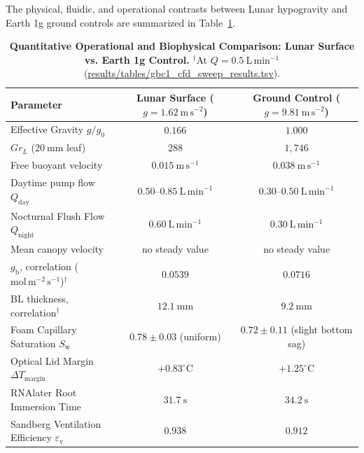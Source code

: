 \documentclass[pdflatex,sn-nature,iicol]{sn-jnl}
\begin{document}
The physical, fluidic, and operational contrasts between Lunar hypogravity and Earth 1g ground controls are summarized in Table~\ref{tab:comparison_matrix}.

\begin{table}[htbp]
\centering
\caption{\textbf{Quantitative Operational and Biophysical Comparison: Lunar Surface vs. Earth 1g Control.} $^{\dagger}$At $Q = 0.5\ \mathrm{L\,min^{-1}}$ (\url{results/tables/gbc1_cfd_sweep_results.tsv}).}
\label{tab:comparison_matrix}
\begin{tabular*}{\textwidth}{@{\extracolsep{\fill}}lcc@{\extracolsep{\fill}}}
\toprule
Parameter & Lunar Surface ($g = 1.62\ \mathrm{m\,s^{-2}}$) & Ground Control ($g = 9.81\ \mathrm{m\,s^{-2}}$) \\
\midrule
Effective Gravity $g / g_0$ & $0.166$ & $1.000$ \\
$Gr_L$ ($20\ \mathrm{mm}$ leaf) & $288$ & $1{,}746$ \\
Free buoyant velocity & $0.015\ \mathrm{m\,s^{-1}}$ & $0.038\ \mathrm{m\,s^{-1}}$ \\
Daytime pump flow $Q_{\mathrm{day}}$ & $\mathbf{0.50\text{--}0.85\ \mathrm{L\,min^{-1}}}$ & $0.30\text{--}0.50\ \mathrm{L\,min^{-1}}$ \\
Nocturnal Flush Flow $Q_{\mathrm{night}}$ & $\mathbf{0.60\ \mathrm{L\,min^{-1}}}$ & $0.30\ \mathrm{L\,min^{-1}}$ \\
Mean canopy velocity & no steady value & no steady value \\
$g_{\mathrm{b}}$, correlation ($\mathrm{mol\,m^{-2}\,s^{-1}}$)$^{\dagger}$ & $0.0539$ & $0.0716$ \\
BL thickness, correlation$^{\dagger}$ & $12.1\ \mathrm{mm}$ & $9.2\ \mathrm{mm}$ \\
Foam Capillary Saturation $S_{\mathrm{w}}$ & $0.78 \pm 0.03$ (uniform) & $0.72 \pm 0.11$ (slight bottom sag) \\
Optical Lid Margin $\Delta T_{\mathrm{margin}}$ & $+0.83^\circ\mathrm{C}$ & $+1.25^\circ\mathrm{C}$ \\
RNAlater Root Immersion Time & $31.7\ \mathrm{s}$ & $34.2\ \mathrm{s}$ \\
Sandberg Ventilation Efficiency $\varepsilon_{\mathrm{v}}$ & $0.938$ & $0.912$ \\
\bottomrule
\end{tabular*}
\end{table}
\end{document}
